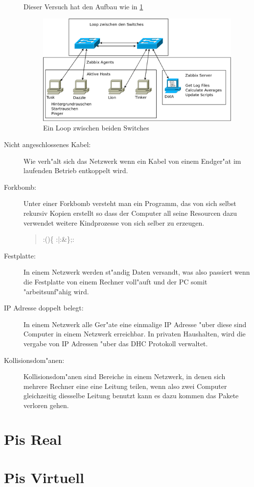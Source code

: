 \begin{description}
Dieser Versuch hat den Aufbau wie in \cref{fig:loop2switch}
\begin{figure}[htbp]
\centering
\includegraphics*[width=0.9\linewidth]{Abb/Versuche/Loop2Switch}
\caption{Ein Loop zwischen beiden Switches}
\label{fig:loop2switch}
\end{figure}

\item[Nicht angeschlossenes Kabel:] Wie verh"alt sich das Netzwerk wenn ein Kabel von einem %
Endger"at im laufenden Betrieb entkoppelt wird.
\item[Forkbomb:]Unter einer Forkbomb versteht man ein Programm, das von sich selbst rekursiv Kopien erstellt %
so dass der Computer all seine Resourcen dazu verwendet weitere Kindprozesse von sich selber zu erzeugen. %
\begin{quote} 
:()\{ :|:\&\};: \autocite{wiki:forkbomb} 
\end{quote}
\item[Festplatte:]In einem Netzwerk werden st"andig Daten versandt, was also %
passiert wenn die Festplatte von einem Rechner voll"auft und der PC somit "arbeitsunf"ahig wird. %
\item[IP Adresse doppelt belegt:]In einem Netzwerk alle Ger"ate eine einmalige  %
IP Adresse "uber diese sind Computer in einem Netzwerk erreichbar. In privaten Haushalten, wird die vergabe von IP Adressen %
"uber das DHC Protokoll verwaltet. \autocite{ietf:DHCP}
\item[Kollisionsdom"anen:] Kollisionsdom"anen sind Bereiche in einem Netzwerk, in denen sich mehrere Rechner eine %
eine Leitung teilen, wenn also zwei Computer gleichzeitig diesselbe Leitung benutzt kann es dazu kommen das Pakete verloren gehen. %
\end{description}

\section{Pis Real}
\section{Pis Virtuell}



